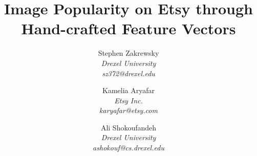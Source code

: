 \documentclass[conference,a4paper]{IEEEtran}
\begin{document}
%
\title{Image Popularity on Etsy through Hand-crafted Feature Vectors}



 \author{
Stephen Zakrewsky\\
\emph{Drexel University}\\
\emph{sz372@drexel.edu}
\and
Kamelia Aryafar\\ 
\emph {Etsy Inc.}\\
\emph {karyafar@etsy.com}
\and
Ali Shokoufandeh\\
\emph{Drexel University}\\
\emph{ashokouf@cs.drexel.edu}}


% 








\maketitle
\end{document}
